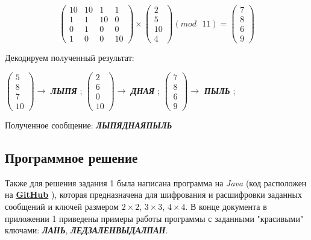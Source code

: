 \documentclass[a5paper, 10pt]{article}
\theoremstyle{definition}
\theoremstyle{plain}
\theoremstyle{remark}
\begin{document}
\begin{equation}
\begin{pmatrix}
10 & 10 & 1 & 1\\
1 & 1 & 10 & 0 \\
0 & 1 & 0 & 0 \\
1 & 0 & 0 & 10
\end{pmatrix}
 \times
\begin{pmatrix}
2\\
5\\
10\\
4
\end{pmatrix}
(mod \text{ }11)
= \begin{pmatrix}
7\\
8\\
6\\
9
\end{pmatrix}
\end{equation}

Декодируем полученный результат:
\begin{center}
 $ \begin{pmatrix}
5\\
8\\
7\\
10
\end{pmatrix} \to$ \textbf{\textit{ЛЫПЯ}} ;
 $ \begin{pmatrix}
2\\
6\\
0\\
10
\end{pmatrix} \to$ \textbf{\textit{ДНАЯ}} ;
 $ \begin{pmatrix}
7\\
8\\
6\\
9
\end{pmatrix} \to$ \textbf{\textit{ПЫЛЬ}} ;
\end{center}
Полученное сообщение:  \textbf{\textit{\colorbox{red! 50}{ЛЫПЯ}\colorbox{green! 50}{ДНАЯПЫЛЬ}}}\\

\subsection{Программное решение}
Также для решения задания 1 была написана программа на \textit{Java} (код расположен на \href{https://github.com/a-nechaeva/practical_Linal/tree/main/lab1/CodePracLinalFirstLab/src/task_1}{\textbf{GitHub}} ), которая предназначена для шифрования и расшифровки заданных сообщений и ключей размером $2 \times 2$,  $3 \times 3$, $4 \times 4$. 
В конце документа в приложении 1 приведены примеры работы программы с заданными "красивыми" ключами:  \textbf{\textit{ЛАНЬ}},  \textbf{\textit{ЛЕДЗАЛЕНВЫДАЛПАН}}.
\end{document}
